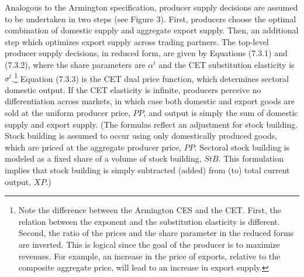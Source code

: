 \documentclass[12pt]{article}
\begin{document}
Analogous to the Armington specification, producer supply decisions are assumed to be undertaken in two steps (see Figure 3). First, producers choose the optimal combination of domestic supply and aggregate export supply. Then, an additional step which optimizes export supply across trading partners. The top-level producer supply decisions, in reduced form, are given by Equations (7.3.1) and (7.3.2), where the share parameters are $\alpha^t$ and the CET substitution elasticity is $\sigma^t$.\footnote{Note the difference between the Armington CES and the CET.  First, the relation between the exponent and the substitution elasticity is different.  Second, the ratio of the prices and the share parameter in the reduced forms are inverted.  This is logical since the goal of the producer is to maximize revenues.  For example, an increase in the price of exports, relative to the composite aggregate price, will lead to an increase in export supply.} Equation (7.3.3) is the CET dual price function, which determines sectoral domestic output. If the CET elasticity is infinite, producers perceive no differentiation across markets, in which case both domestic and export goods are sold at the uniform producer price, $PP$, and output is simply the sum of domestic supply and export supply. (The formulas reflect an adjustment for stock building. Stock building is assumed to occur using only domestically produced goods, which are priced at the aggregate producer price, $PP$. Sectoral stock building is modeled as a fixed share of a volume of stock building, $StB$. This formulation implies that stock building is simply subtracted (added) from (to) total current output, $XP$.)

\end{document}
